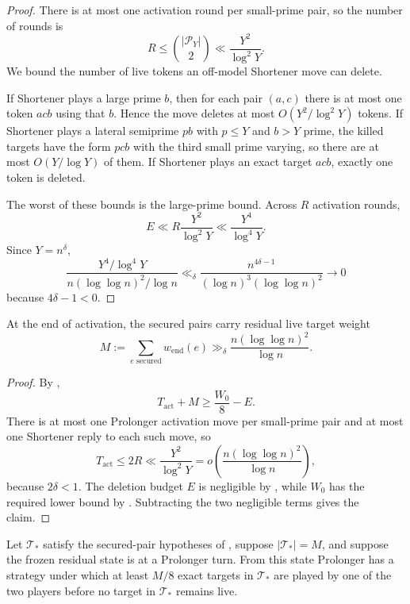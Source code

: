 \begin{proof}
There is at most one activation round per small-prime pair, so the number of
rounds is
\[
  R\le \binom{|\mathcal P_Y|}{2}
  \ll \frac{Y^2}{\log^2Y}.
\]
We bound the number of live tokens an off-model Shortener move can delete.

If Shortener plays a large prime $b$, then for each pair $(a,c)$ there is at
most one token $acb$ using that $b$.  Hence the move deletes at most
$O(Y^2/\log^2Y)$ tokens.  If Shortener plays a lateral semiprime $pb$ with
$p\le Y$ and $b>Y$ prime, the killed targets have the form $pcb$ with the
third small prime varying, so there are at most $O(Y/\log Y)$ of them.  If
Shortener plays an exact target $acb$, exactly one token is deleted.

The worst of these bounds is the large-prime bound.  Across $R$ activation
rounds,
\[
  E\ll R\frac{Y^2}{\log^2Y}
  \ll \frac{Y^4}{\log^4Y}.
\]
Since $Y=n^\delta$,
\[
  \frac{Y^4/\log^4Y}{n(\log\log n)^2/\log n}
  \ll_\delta
  \frac{n^{4\delta-1}}{(\log n)^3(\log\log n)^2}
  \to 0
\]
because $4\delta-1<0$.
\end{proof}

\begin{proposition}\label{prop:t2-residual-mass}
At the end of activation, the secured pairs carry residual live target weight
\[
  M:=
  \sum_{e\text{ secured}} w_{\mathrm{end}}(e)
  \gg_\delta
  \frac{n(\log\log n)^2}{\log n}.
\]
\end{proposition}

\begin{proof}
By ,
\[
  T_{\mathrm{act}}+M\ge \frac{W_0}{8}-E.
\]
There is at most one Prolonger activation move per small-prime pair and at
most one Shortener reply to each such move, so
\[
  T_{\mathrm{act}}\le 2R\ll \frac{Y^2}{\log^2Y}
  =
  o\!\left(\frac{n(\log\log n)^2}{\log n}\right),
\]
because $2\delta<1$.  The deletion budget $E$ is negligible by
, while $W_0$ has the required lower bound by
.  Subtracting the two negligible terms gives the
claim.
\end{proof}

\begin{proposition}
\label{prop:t2-residual-capture}\label{prop:t2-finite-capture}
Let $\mathcal T_*$ satisfy the secured-pair hypotheses of
, suppose $|\mathcal T_*|=M$, and suppose the
frozen residual state is at a Prolonger turn.  From this state Prolonger has a
strategy under which at least $M/8$ exact targets in $\mathcal T_*$ are played
by one of the two players before no target in $\mathcal T_*$ remains live.
\end{proposition}

